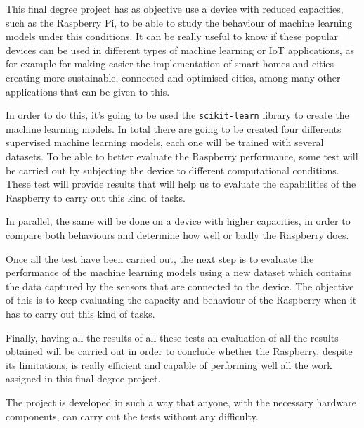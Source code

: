 \documentclass[a4paper, 12pt]{book}
\begin{document}
This final degree project has as objective use a device with reduced capacities, such as the Raspberry Pi, to be able to study the behaviour of machine learning models under this conditions. It can be really useful to know if these popular devices can be used in different types of machine learning or IoT applications, as for example for making easier the implementation of smart homes and cities creating more sustainable, connected and optimised cities, among many other applications that can be given to this.

In order to do this, it's going to be used the \texttt{scikit-learn} library to create the machine learning models. In total there are going to be created four differents supervised machine learning models, each one will be trained with several datasets. To be able to better evaluate the Raspberry performance, some test will be carried out by subjecting the device to different computational conditions. These test will provide results that will help us to evaluate the capabilities of the Raspberry to carry out this kind of tasks.

In parallel, the same will be done on a device with higher capacities, in order to compare both behaviours and determine how well or badly the Raspberry does.

Once all the test have been carried out, the next step is to evaluate the performance of the machine learning models using a new dataset which contains the data captured by the sensors that are connected to the device. The objective of this is to keep evaluating the capacity and behaviour of the Raspberry when it has to carry out this kind of tasks.

Finally, having all the results of all these tests an evaluation of all the results obtained will be carried out in order to conclude whether the Raspberry, despite its limitations, is really efficient and capable of performing well all the work assigned in this final degree project.

The project is developed in such a way that anyone, with the necessary hardware components, can carry out the tests without any difficulty.


\end{document}
